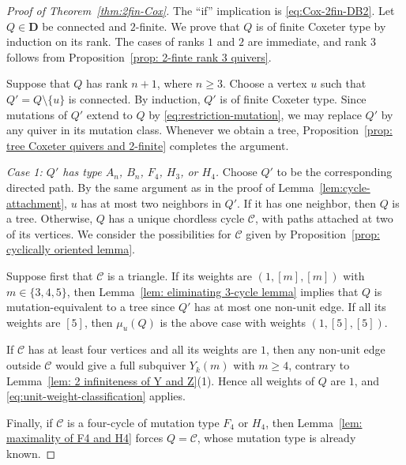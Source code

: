 \documentclass[11pt,reqno]{amsart}
\numberwithin{equation}{section}
\theoremstyle{definition}
\theoremstyle{plain}
\newcommand{\D}{\mathbf{D}}
\newcommand{\bra}[1]{\left[#1\right]}
\begin{document}
	\begin{proof}[Proof of Theorem~\ref{thm:2fin-Cox}]
		The ``if'' implication is \eqref{eq:Cox-2fin-DB2}. Let $Q\in\D$ be connected and $2$-finite. We prove that $Q$ is of finite Coxeter type by induction on its rank. The cases of ranks $1$ and $2$ are immediate, and rank $3$ follows from Proposition~\ref{prop: 2-finte rank 3 quivers}.
		
		Suppose that $Q$ has rank $n+1$, where $n\geq3$. Choose a vertex $u$ such that $Q'=Q\setminus\{u\}$ is connected. By induction, $Q'$ is of finite Coxeter type. Since mutations of $Q'$ extend to $Q$ by \eqref{eq:restriction-mutation}, we may replace $Q'$ by any quiver in its mutation class. Whenever we obtain a tree, Proposition~\ref{prop: tree Coxeter quivers and 2-finite} completes the argument.
		
		\medskip
		\noindent\emph{Case 1: $Q'$ has type $A_n$, $B_n$, $F_4$, $H_3$, or $H_4$.}
		Choose $Q'$ to be the corresponding directed path. By the same argument as in the proof of Lemma~\ref{lem:cycle-attachment}, $u$ has at most two neighbors in $Q'$. If it has one neighbor, then $Q$ is a tree. Otherwise, $Q$ has a unique chordless cycle $\mathcal C$, with paths attached at two of its vertices. We consider the possibilities for $\mathcal C$ given by Proposition~\ref{prop: cyclically oriented lemma}.
			
		Suppose first that $\mathcal C$ is a triangle. If its weights are $(1,\bra{m},\bra{m})$ with $m\in\{3,4,5\}$, then Lemma~\ref{lem: eliminating 3-cycle lemma} implies that $Q$ is mutation-equivalent to a tree since $Q'$ has at most one non-unit edge. If all its weights are $\bra{5}$, then $\mu_u(Q)$ is the above case with weights $(1,\bra{5},\bra{5})$.
		
		If $\mathcal C$ has at least four vertices and all its weights are $1$, then any non-unit edge outside $\mathcal C$ would give a full subquiver $Y_k(m)$ with $m\geq4$, contrary to Lemma~\ref{lem: 2 infiniteness of Y and Z}(1). Hence all weights of $Q$ are $1$, and \eqref{eq:unit-weight-classification} applies.
		
		Finally, if $\mathcal C$ is a four-cycle of mutation type $F_4$ or $H_4$, then Lemma~\ref{lem: maximality of F4 and H4} forces $Q=\mathcal C$, whose mutation type is already known.
		

\end{proof}
\end{document}
